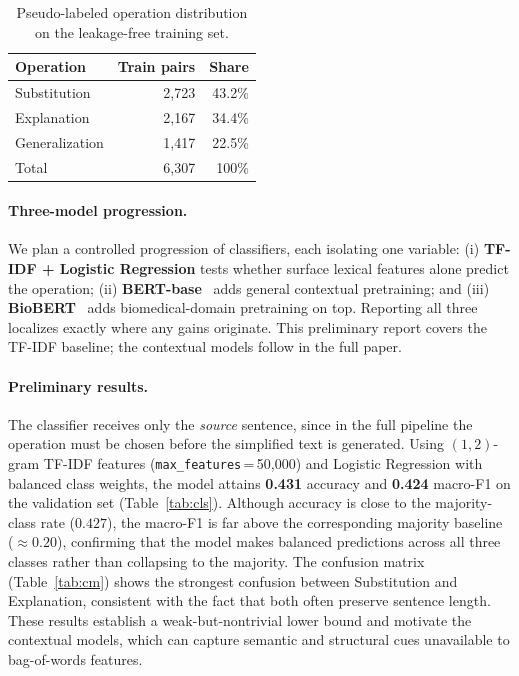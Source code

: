 \documentclass[11pt]{article}
\begin{document}
\begin{table}[h]
\centering
\begin{tabular}{lrr}
\toprule
Operation & Train pairs & Share \\
\midrule
Substitution   & 2{,}723 & 43.2\% \\
Explanation    & 2{,}167 & 34.4\% \\
Generalization & 1{,}417 & 22.5\% \\
\midrule
Total          & 6{,}307 & 100\% \\
\bottomrule
\end{tabular}
\caption{Pseudo-labeled operation distribution on the leakage-free training set.}
\label{tab:dist}
\end{table}

\paragraph{Three-model progression.}
We plan a controlled progression of classifiers, each isolating one variable:
(i) \textbf{TF-IDF + Logistic Regression} tests whether surface lexical features
alone predict the operation; (ii) \textbf{BERT-base}~\cite{bert} adds general
contextual pretraining; and (iii) \textbf{BioBERT}~\cite{biobert} adds
biomedical-domain pretraining on top. Reporting all three localizes exactly
where any gains originate. This preliminary report covers the TF-IDF baseline;
the contextual models follow in the full paper.

\paragraph{Preliminary results.}
The classifier receives only the \emph{source} sentence, since in the full
pipeline the operation must be chosen before the simplified text is generated.
Using $(1,2)$-gram TF-IDF features (\texttt{max\_features}\,=\,50{,}000) and
Logistic Regression with balanced class weights, the model attains
\textbf{0.431} accuracy and \textbf{0.424} macro-F1 on the validation set
(Table~\ref{tab:cls}). Although accuracy is close to the majority-class rate
($0.427$), the macro-F1 is far above the corresponding majority baseline
($\approx 0.20$), confirming that the model makes balanced predictions across
all three classes rather than collapsing to the majority. The confusion matrix
(Table~\ref{tab:cm}) shows the strongest confusion between Substitution and
Explanation, consistent with the fact that both often preserve sentence length.
These results establish a weak-but-nontrivial lower bound and motivate the
contextual models, which can capture semantic and structural cues unavailable
to bag-of-words features.
\end{document}
